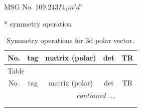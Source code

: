 \documentclass[fleqn,8pt]{jsarticle}
\begin{document}
\setcounter{MaxMatrixCols}{32}

\renewcommand{\tablename}{Table~}
\renewcommand{\figurename}{Figure~}
\begin{center}
\LARGE
MSG No. 109.243\quad$I4_{1}m'd'$
\end{center}
* symmetry operation
\renewcommand{\arraystretch}{1.3}
\begin{longtable}{ccccc}
\caption{Symmetry operations for 3d polar vector.}
 \\
 \hline \hline
No. & tag & matrix (polar) & det & TR \\ \hline \endfirsthead

\multicolumn{4}{l}{\tablename\ \thetable{}} \\
 \hline \hline
No. & tag & matrix (polar) & det & TR \\ \hline \endhead

 \hline \hline
\multicolumn{4}{r}{\footnotesize\it continued ...} \\ \endfoot

 \hline \hline
\multicolumn{4}{r}{} \\ \endlastfoot


\end{longtable}
\end{document}
